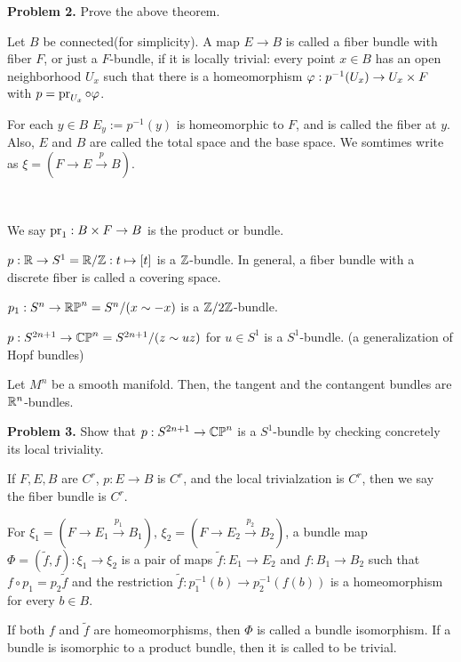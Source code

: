 \documentclass{../../small}
\begin{document}
\textbf{Problem 2.} Prove the above theorem.

\begin{defn}
Let $B$ be connected(for simplicity).
A map $E\to B$ is called a fiber bundle with fiber $F$, or just a $F$-bundle, if it is locally trivial: every point $x\in B$ has an open neighborhood $U_x$ such that there is a homeomorphism $\varphi:p^{-1}(U_x)\to U_x\times F$ with $p=\operatorname{pr}_{U_x}\circ\varphi$.

For each $y\in B$ $E_y:=p^{-1}(y)$ is homeomorphic to $F$, and is called the fiber at $y$.
Also, $E$ and $B$ are called the total space and the base space.
We somtimes write as $\xi=(F\to E\xrightarrow{p}B)$.
\end{defn}
\begin{ex*}\,
\begin{parts}
\item We say $\operatorname{pr}_1:B\times F\to B$ is the product or bundle.
\item $p:\mathbb{R}\to S^1=\mathbb{R}/\mathbb{Z}:t\mapsto[t]$ is a $\mathbb{Z}$-bundle. In general, a fiber bundle with a discrete fiber is called a covering space.
\item $p_1:S^n\to\mathbb{RP}^n=S^n/(x\sim-x)$ is a $\mathbb{Z}/2\mathbb{Z}$-bundle.
\item $p:S^{2n+1}\to\mathbb{CP}^n=S^{2n+1}/(z\sim uz)$ for $u\in S^1$ is a $S^1$-bundle. (a generalization of Hopf bundles)
\item Let $M^n$ be a smooth manifold. Then, the tangent and the contangent bundles are $\mathbb{R}^n$-bundles.
\end{parts}
\end{ex*}

\textbf{Problem 3.} Show that $p:S^{2n+1}\to\mathbb{CP}^n$ is a $S^1$-bundle by checking concretely its local triviality.

\begin{defn}
If $F,E,B$ are $C^r$, $p:E\to B$ is $C^r$, and the local trivialzation is $C^r$, then we say the fiber bundle is $C^r$.
\end{defn}
\begin{defn}
For $\xi_1=(F\to E_1\xrightarrow{p_1}B_1)$, $\xi_2=(F\to E_2\xrightarrow{p_2}B_2)$, a bundle map $\Phi=(\tilde f,f):\xi_1\to\xi_2$ is a pair of maps $\tilde f:E_1\to E_2$ and $f:B_1\to B_2$ such that $f\circ p_1=p_2\tilde f$ and the restriction $\tilde f:p_1^{-1}(b)\to p_2^{-1}(f(b))$ is a homeomorphism for every $b\in B$.

If both $f$ and $\tilde f$ are homeomorphisms, then $\Phi$ is called a bundle isomorphism.
If a bundle is isomorphic to a product bundle, then it is called to be trivial.
\end{defn}
\end{document}
